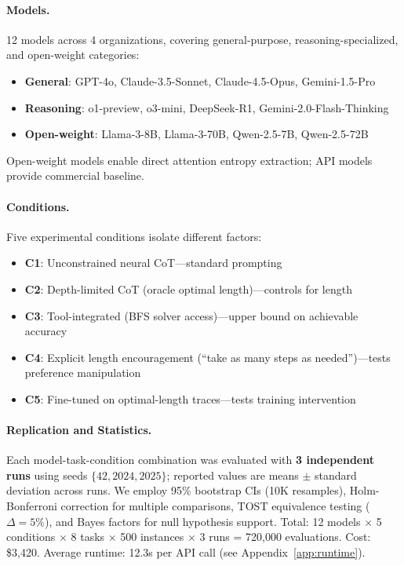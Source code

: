 \documentclass{article}
\theoremstyle{plain}
\theoremstyle{definition}
\theoremstyle{remark}
\begin{document}
\paragraph{Models.} 12 models across 4 organizations, covering general-purpose, reasoning-specialized, and open-weight categories:
\begin{itemize}[leftmargin=*,itemsep=0pt]
\item \textbf{General}: GPT-4o, Claude-3.5-Sonnet, Claude-4.5-Opus, Gemini-1.5-Pro
\item \textbf{Reasoning}: o1-preview, o3-mini, DeepSeek-R1, Gemini-2.0-Flash-Thinking
\item \textbf{Open-weight}: Llama-3-8B, Llama-3-70B, Qwen-2.5-7B, Qwen-2.5-72B
\end{itemize}
Open-weight models enable direct attention entropy extraction; API models provide commercial baseline.

\paragraph{Conditions.} Five experimental conditions isolate different factors:
\begin{itemize}[leftmargin=*,itemsep=0pt]
\item \textbf{C1}: Unconstrained neural CoT---standard prompting
\item \textbf{C2}: Depth-limited CoT (oracle optimal length)---controls for length
\item \textbf{C3}: Tool-integrated (BFS solver access)---upper bound on achievable accuracy
\item \textbf{C4}: Explicit length encouragement (``take as many steps as needed'')---tests preference manipulation
\item \textbf{C5}: Fine-tuned on optimal-length traces---tests training intervention
\end{itemize}

\paragraph{Replication and Statistics.} Each model-task-condition combination was evaluated with \textbf{3 independent runs} using seeds $\{42, 2024, 2025\}$; reported values are means $\pm$ standard deviation across runs. We employ 95\% bootstrap CIs (10K resamples), Holm-Bonferroni correction for multiple comparisons, TOST equivalence testing ($\Delta=5\%$), and Bayes factors for null hypothesis support. Total: 12 models $\times$ 5 conditions $\times$ 8 tasks $\times$ 500 instances $\times$ 3 runs = 720,000 evaluations. Cost: \$3,420. Average runtime: 12.3s per API call (see Appendix~\ref{app:runtime}).
\end{document}
